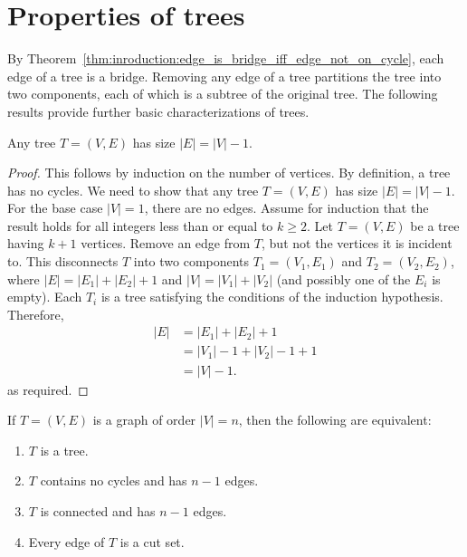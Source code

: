 
\section{Properties of trees}

By Theorem~\ref{thm:inroduction:edge_is_bridge_iff_edge_not_on_cycle},
each edge of a tree is a bridge. Removing any edge of a tree
partitions the tree into two components, each of which is a subtree of
the original tree. The following results provide further basic
characterizations of trees.

\begin{theorem}
\label{thm:trees_forests:each_tree_has_size_n_minus_one}
Any tree $T = (V,E)$ has size $|E| = |V| - 1$.
\end{theorem}

\begin{proof}
This follows by induction on the number of vertices. By definition, a
tree has no cycles. We need to show that any tree $T = (V,E)$ has size
$|E| = |V| - 1$. For the base case $|V| = 1$, there are no
edges. Assume for induction that the result holds for all integers
less than or equal to $k \geq 2$. Let $T = (V,E)$ be a tree having
$k + 1$ vertices. Remove an edge from $T$, but not the vertices it is
incident to. This disconnects $T$ into two components
$T_1 = (V_1, E_1)$ and $T_2 = (V_2, E_2)$, where
$|E| = |E_1| + |E_2| + 1$ and $|V| = |V_1| + |V_2|$ (and possibly one
of the $E_i$ is empty). Each $T_i$ is a tree satisfying the conditions
of the induction hypothesis. Therefore,
\begin{align*}
|E|
&=
|E_1| + |E_2| + 1 \\[4pt]
&=
|V_1| - 1 + |V_2| - 1 + 1 \\[4pt]
&=
|V| - 1.
\end{align*}
as required.
\end{proof}

\begin{corollary}
If $T = (V,E)$ is a graph of order $|V| = n$, then the following are
equivalent:
\begin{enumerate}
\item\label{enu:trees_forests:is_tree} $T$ is a tree.

\item\label{enu:trees_forests:no_cycles_n_minus_one_edges} $T$
  contains no cycles and has $n - 1$ edges.

\item\label{enu:trees_forests:connected_n_minus_one_edges} $T$ is
  connected and has $n - 1$ edges.

\item\label{enu:trees_forests:each_edge_is_cut_set} Every edge of $T$
  is a cut set.
\end{enumerate}
\end{corollary}

